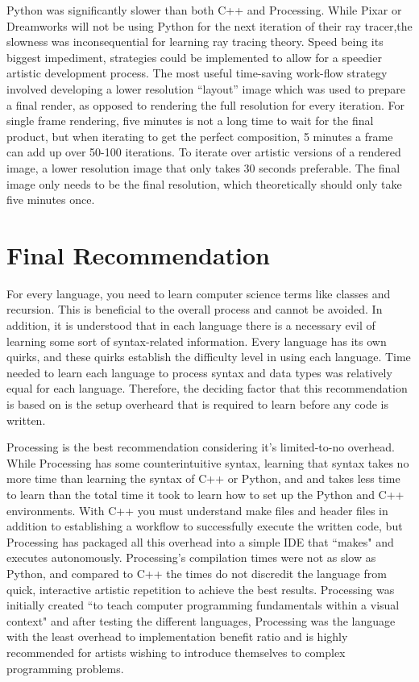 Python was significantly slower than both C++ and Processing.  While Pixar or Dreamworks will not be using Python for the next iteration of their ray tracer,the slowness was inconsequential for learning ray tracing theory.  Speed being its biggest impediment, strategies could be implemented to allow for a speedier artistic development process.  The most useful time-saving work-flow strategy involved developing a lower resolution ``layout'' image which was used to prepare a final render, as opposed to rendering the full resolution for every iteration.  For single frame rendering, five minutes is not a long time to wait for the final product, but when iterating to get the perfect composition, 5 minutes a frame can add up over 50-100 iterations.  To iterate over artistic versions of a rendered image, a lower resolution image that only takes 30 seconds preferable.  The final image only needs to be the final resolution, which theoretically should only take five minutes once.

\section{Final Recommendation}
For every language, you need to learn computer science terms like classes and recursion.  This is beneficial to the overall process and cannot be avoided.  In addition, it is understood that in each language there is a necessary evil of learning some sort of syntax-related information.  Every language has its own quirks, and these quirks establish the difficulty level in using each language.  Time needed to learn each language to process syntax and data types was relatively equal for each language.  Therefore, the deciding factor that this recommendation is based on is the setup overheard that is required to learn before any code is written.  

Processing is the best recommendation considering it's limited-to-no overhead.  While Processing has some counterintuitive syntax, learning that syntax takes no more time than learning the syntax of C++ or Python, and and takes less time to learn than the total time it took to learn how to set up the Python and C++ environments.  With C++ you must understand make files and header files in addition to establishing a workflow to successfully execute the written code, but Processing has packaged all this overhead into a simple IDE that ``makes" and executes autonomously.  Processing's compilation times were not as slow as Python, and compared to C++ the times do not discredit the language from quick, interactive artistic repetition to achieve the best results.  Processing was initially created ``to teach computer programming fundamentals within a visual context" and after testing the different languages, Processing was the language with the least overhead to implementation benefit ratio and is highly recommended for artists wishing to introduce themselves to complex programming problems.  